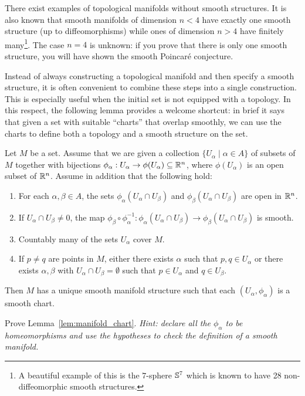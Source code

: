 \begin{remark}
	There exist examples of topological manifolds without smooth structures.
	It is also known that smooth manifolds of dimension $n < 4$ have exactly one smooth structure (up to diffeomorphisms) while ones of dimension $n > 4$ have finitely many\footnote{A beautiful example of this is the $7$-sphere $\mathbb{S}^7$ which is known to have 28 non-diffeomorphic smooth structures.}.
	The case $n = 4$ is unknown: if you prove that there is only one smooth structure, you will have shown the smooth Poincar\'e conjecture.
\end{remark}

Instead of always constructing a topological manifold and then specify a smooth structure, it is often convenient to combine these steps into a single construction.
This is especially useful when the initial set is not equipped with a topology.
In this respect, the following lemma provides a welcome shortcut: in brief it says that given a set with suitable ``charts'' that overlap smoothly, we can use the charts to define both a topology and a smooth structure on the set.

\begin{lemma}\label{lem:manifold_chart}
  Let $M$ be a set. Assume that we are given a collection $\{U_\alpha\mid \alpha\in A\}$ of subsets of $M$ together with bijections $\phi_\alpha: U_\alpha\to\phi(U_\alpha)\subseteq\mathbb{R}^n$, where $\phi(U_\alpha)$ is an open subset of $\mathbb{R}^n$. Assume in addition that the following hold:
  \begin{enumerate}
    \item For each $\alpha, \beta \in A$, the sets $\phi_\alpha(U_\alpha \cap U_\beta)$ and $\phi_\beta(U_\alpha \cap U_\beta)$ are open in $\mathbb{R}^n$.
    \item If $U_\alpha \cap U_\beta \neq 0$, the map $\phi_\beta\circ\phi_\alpha^{-1}: \phi_\alpha(U_\alpha \cap U_\beta)\to \phi_\beta(U_\alpha \cap U_\beta)$ is smooth.
    \item Countably many of the sets $U_\alpha$ cover $M$.
    \item If $p\neq q$ are points in $M$, either there exists $\alpha$ such that $p,q\in U_\alpha$ or there exists $\alpha,\beta$ with $U_\alpha\cap U_\beta=\emptyset$ such that $p\in U_\alpha$ and $q\in U_\beta$.
  \end{enumerate}
  Then $M$ has a unique smooth manifold structure such that each $(U_\alpha,\phi_\alpha)$ is a smooth chart.
\end{lemma}
\begin{exercise}
  Prove Lemma~\ref{lem:manifold_chart}. \textit{\small Hint: declare all the $\phi_\alpha$ to be homeomorphisms and use the hypotheses to check the definition of a smooth manifold.}
\end{exercise}

